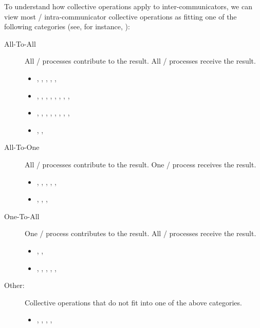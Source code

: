 To understand how collective operations apply to inter-communicators,
we can view most \MPI/ intra-communicator
collective operations as fitting one of the following categories (see, for
instance,
\cite{skjellum.doss.viswanathan.94}):
\begin{description}
\item[All-To-All] All \MPI/ processes contribute to the result.  All \MPI/ processes
  receive the result.
  \begin{itemize}
  \item {}, , ,
  , , 
  \item {}, , ,
  , , ,
  , , 
  \item {}, , ,
  , ,
  ,
  ,   ,
  \item {}, , 
  \end{itemize}
\item[All-To-One] All \MPI/ processes contribute to the result.  One \MPI/ process
  receives the result.
  \begin{itemize}
  \item {}, , ,
  , , 
  \item {}, , ,
  \end{itemize}
\item[One-To-All] One \MPI/ process contributes to the result.  All \MPI/ processes
  receive the result.
  \begin{itemize}
  \item {}, , 
  \item {}, , ,
  , , 
  \end{itemize}
\item[Other:] Collective operations that do not fit into one of the above
  categories.
  \begin{itemize}
  \item {}, , 
  , , 
  \end{itemize}
\end{description}

